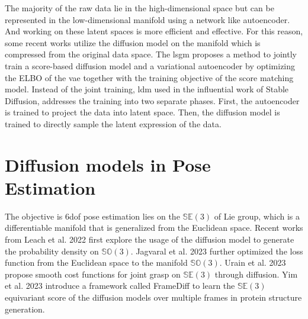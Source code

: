 \documentclass[12pt,DIV14,BCOR12mm,a4paper,footinclude=false,headinclude,parskip=half-,twoside,openright,cleardoublepage=empty,toc=index,bibliography=totoc,listof=totoc]{scrreprt}
\numberwithin{equation}{chapter}
\begin{document}
The majority of the raw data lie in the high-dimensional space but can be represented in the low-dimensional manifold using a network like autoencoder. And working on these latent spaces is more efficient and effective. For this reason, some recent works utilize the diffusion model on the manifold which is compressed from the original data space. The \gls{lsgm} \cite{vahdat2021scorebased} proposes a method to jointly train a score-based diffusion model and a variational autoencoder by optimizing the ELBO of the \gls{vae} together with the training objective of the score matching model. Instead of the joint training, \gls{ldm} \cite{rombach2022highresolution} used in the influential work of Stable Diffusion, addresses the training into two separate phases. First, the autoencoder is trained to project the data into latent space. Then, the diffusion model is trained to directly sample the latent expression of the data.

\section{Diffusion models in Pose Estimation}
The objective is \gls{6dof} pose estimation lies on the $\mathbb{SE}(3)$ of Lie group, which is a differentiable manifold that is generalized from the Euclidean space. Recent works from Leach et al. 2022 \cite{leach2022denoising} first explore the usage of the diffusion model to generate the probability density on $\mathbb{SO}(3)$. Jagvaral et al. 2023 \cite{jagvaral2023diffusion} further optimized the loss function from the Euclidean space to the manifold $\mathbb{SO}(3)$. Urain et al. 2023 \cite{urain2023se3diffusionfields} propose smooth cost functions for joint grasp on $\mathbb{SE}(3)$ through diffusion. Yim et al. 2023 \cite{yim2023se3} introduce a framework called FrameDiff to learn the $\mathbb{SE}(3)$ equivariant score of the diffusion models over multiple frames in protein structure generation. 
\end{document}

